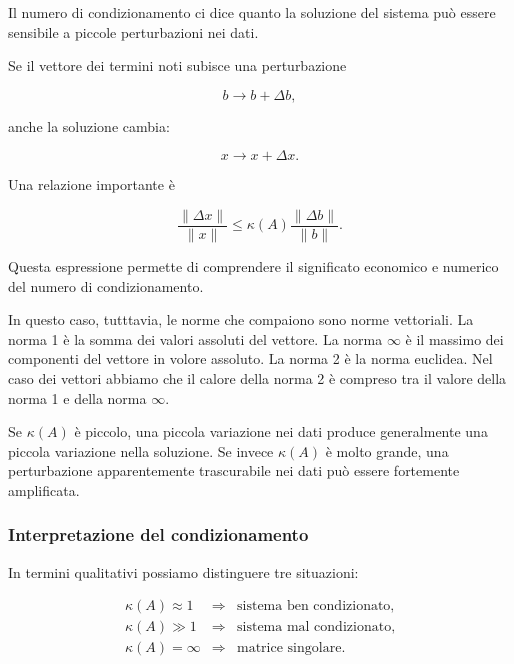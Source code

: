Il numero di condizionamento ci dice quanto la soluzione del sistema
può essere sensibile a piccole perturbazioni nei dati.

Se il vettore dei termini noti subisce una perturbazione

\begin{equation*}
    b\longrightarrow b+\Delta b,
\end{equation*}

anche la soluzione cambia:

\begin{equation*}
    x\longrightarrow x+\Delta x.
\end{equation*}

Una relazione importante è

\begin{equation*}
    \frac{\|\Delta x\|}{\|x\|}
    \leq
    \kappa(A)
    \frac{\|\Delta b\|}{\|b\|}.
    \label{eq:condition-bound}
\end{equation*}

Questa espressione permette di comprendere il significato economico
e numerico del numero di condizionamento.

In questo caso, tutttavia, le norme che compaiono sono norme vettoriali. La norma 1 è la somma dei valori assoluti del vettore. La norma $\infty$ è il massimo dei componenti del vettore in volore assoluto. La norma 2 è la norma euclidea. Nel caso dei vettori abbiamo che il calore della norma 2 è compreso tra il valore della norma 1 e della norma $\infty$.

Se $\kappa(A)$ è piccolo, una piccola variazione nei dati produce
generalmente una piccola variazione nella soluzione. Se invece
$\kappa(A)$ è molto grande, una perturbazione apparentemente
trascurabile nei dati può essere fortemente amplificata.


\subsubsection{Interpretazione del condizionamento}

In termini qualitativi possiamo distinguere tre situazioni:

\begin{equation*}
\begin{array}{lll}
\kappa(A)\approx 1
&\Rightarrow&
\text{sistema ben condizionato},\\[2mm]
\kappa(A)\gg 1
&\Rightarrow&
\text{sistema mal condizionato},\\[2mm]
\kappa(A)=\infty
&\Rightarrow&
\text{matrice singolare}.
\end{array}
\end{equation*}

